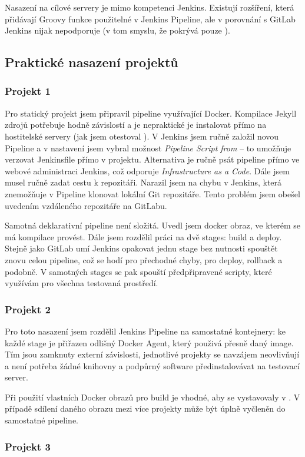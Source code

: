         Nasazení na cílové servery je mimo kompetenci Jenkins. Existují rozšíření, která přidávají Groovy funkce použitelné v Jenkins Pipeline, ale v porovnání s GitLab Jenkins nijak \CD nepodporuje (v tom smyslu, že pokrývá pouze \CI).

    \subsection{Praktické nasazení projektů}
        \subsubsection{Projekt 1}
            Pro statický projekt jsem připravil pipeline využívající Docker. Kompilace Jekyll zdrojů potřebuje hodně závislostí a je nepraktické je instalovat přímo na hostitelské servery (jak jsem otestoval ). V Jenkins jsem ručně založil novou Pipeline a v nastavení jsem vybral možnost \textit{Pipeline Script from } -- to umožňuje verzovat Jenkinsfile přímo v projektu. Alternativa je ručně psát pipeline přímo ve webové administraci Jenkins, což odporuje \textit{Infrastructure as a Code}. Dále jsem musel ručně zadat cestu k repozitáři. Narazil jsem na chybu v Jenkins, která znemožňuje v Pipeline klonovat lokální Git repozitáře. Tento problém jsem obešel uvedením vzdáleného repozitáře na GitLabu.

            Samotná deklarativní pipeline není složitá. Uvedl jsem docker obraz, ve kterém se má kompilace provést. Dále jsem rozdělil práci na dvě stages: build a deploy. Stejně jako GitLab umí Jenkins opakovat jednu stage bez nutnosti spouštět znovu celou pipeline, což se hodí pro přechodné chyby, pro deploy, rollback a podobně. V samotných stages se pak spouští předpřipravené scripty, které využívám pro všechna testovaná \CICD prostředí.

        \subsubsection{Projekt 2}
            Pro toto nasazení jsem rozdělil Jenkins Pipeline na samostatné kontejnery: ke každé stage je přiřazen odlišný Docker Agent, který použivá přesně daný image. Tím jsou zamknuty externí závislosti, jednotlivé projekty se navzájem neovlivňují a není potřeba žádné knihovny a podpůrný software předinstalovávat na testovací server.

            Při použití vlastních Docker obrazů pro build je vhodné, aby se vystavovaly v \CI. V případě sdílení daného obrazu mezi více projekty může být úplně vyčleněn do samostatné pipeline.

        \subsubsection{Projekt 3}
            \blind[2]
